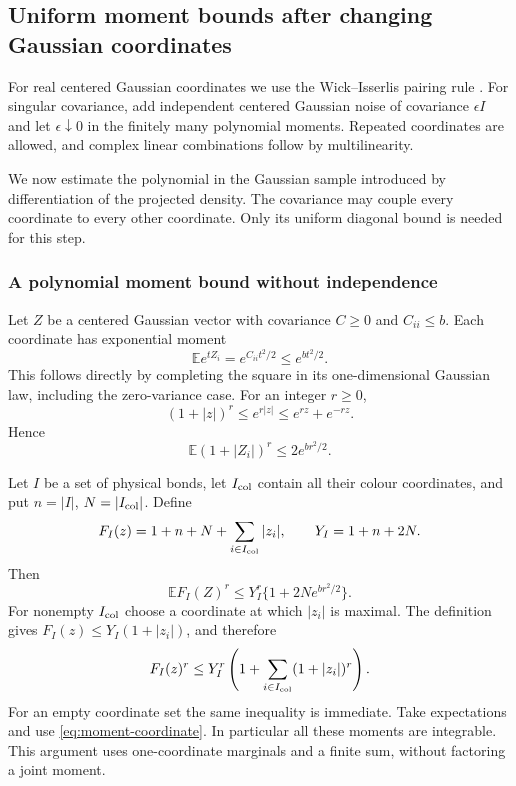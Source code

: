 \subsection{Uniform moment bounds after changing Gaussian coordinates}
\label{sec:gaussian-moment-prices}

For real centered Gaussian coordinates we use the Wick--Isserlis
pairing rule \cite[Theorem~1]{IsserlisProof}. For singular covariance,
add independent centered Gaussian noise of covariance $\epsilon I$ and
let $\epsilon\downarrow0$ in the finitely many polynomial moments.
Repeated coordinates are allowed, and complex linear combinations
follow by multilinearity.

We now estimate the polynomial in the Gaussian sample introduced
by differentiation of the projected density. The covariance may
couple every coordinate to every other coordinate. Only its
uniform diagonal bound is needed for this step.

\subsubsection{A polynomial moment bound without independence}
Let $Z$ be a centered Gaussian vector with covariance $C\ge0$ and
$C_{ii}\le b$. Each coordinate has exponential moment
\[
 \mathbb E e^{tZ_i}=e^{C_{ii}t^2/2}\le e^{bt^2/2}.
\]
This follows directly by completing the square in its one-dimensional
Gaussian law, including the zero-variance case. For an integer
$r\ge0$,
\[
 (1+|z|)^r\le e^{r|z|}\le e^{rz}+e^{-rz}.
\]
Hence
\begin{equation}\label{eq:moment-coordinate}
 \mathbb E(1+|Z_i|)^r\le2e^{br^2/2}.
\end{equation}

Let $I$ be a set of physical bonds, let $I_{\rm col}$ contain all
their colour coordinates, and put $n=|I|$, $N=|I_{\rm col}|$.
Define
\[
 F_I(z)=1+n+N+\sum_{i\in I_{\rm col}}|z_i|,
 \qquad Y_I=1+n+2N.
\]
Then
\begin{equation}\label{eq:moment-face}
 \mathbb E F_I(Z)^r\le
 Y_I^r\{1+2Ne^{br^2/2}\}.
\end{equation}
For nonempty $I_{\rm col}$ choose a coordinate at which $|z_i|$
is maximal. The definition gives $F_I(z)\le Y_I(1+|z_i|)$, and
therefore
\[
 F_I(z)^r\le Y_I^r
       \left(1+\sum_{i\in I_{\rm col}}(1+|z_i|)^r\right).
\]
For an empty coordinate set the same inequality is immediate.
Take expectations and use \eqref{eq:moment-coordinate}. In
particular all these moments are integrable. This argument uses
one-coordinate marginals and a finite sum, without factoring a
joint moment.

